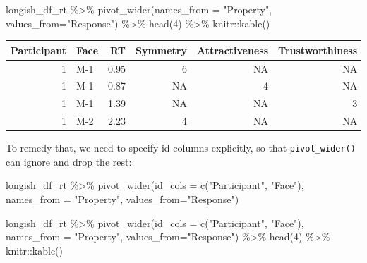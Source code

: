 \documentclass[
]{book}
\newenvironment{Shaded}{\begin{snugshade}}{\end{snugshade}}
\newcommand{\AttributeTok}[1]{\textcolor[rgb]{0.77,0.63,0.00}{#1}}
\newcommand{\DecValTok}[1]{\textcolor[rgb]{0.00,0.00,0.81}{#1}}
\newcommand{\FunctionTok}[1]{\textcolor[rgb]{0.00,0.00,0.00}{#1}}
\newcommand{\NormalTok}[1]{#1}
\newcommand{\SpecialCharTok}[1]{\textcolor[rgb]{0.00,0.00,0.00}{#1}}
\newcommand{\StringTok}[1]{\textcolor[rgb]{0.31,0.60,0.02}{#1}}
\begin{document}
\begin{Shaded}
\begin{Highlighting}[]
\NormalTok{longish\_df\_rt }\SpecialCharTok{\%\textgreater{}\%}
  \FunctionTok{pivot\_wider}\NormalTok{(}\AttributeTok{names\_from =} \StringTok{"Property"}\NormalTok{, }\AttributeTok{values\_from=}\StringTok{"Response"}\NormalTok{) }\SpecialCharTok{\%\textgreater{}\%}
  \FunctionTok{head}\NormalTok{(}\DecValTok{4}\NormalTok{) }\SpecialCharTok{\%\textgreater{}\%}
\NormalTok{  knitr}\SpecialCharTok{::}\FunctionTok{kable}\NormalTok{()}
\end{Highlighting}
\end{Shaded}

\begin{tabular}{r|l|r|r|r|r}
\hline
Participant & Face & RT & Symmetry & Attractiveness & Trustworthiness\\
\hline
1 & M-1 & 0.95 & 6 & NA & NA\\
\hline
1 & M-1 & 0.87 & NA & 4 & NA\\
\hline
1 & M-1 & 1.39 & NA & NA & 3\\
\hline
1 & M-2 & 2.23 & 4 & NA & NA\\
\hline
\end{tabular}

To remedy that, we need to specify id columns explicitly, so that \texttt{pivot\_wider()} can ignore and drop the rest:

\begin{Shaded}
\begin{Highlighting}[]
\NormalTok{longish\_df\_rt }\SpecialCharTok{\%\textgreater{}\%}
  \FunctionTok{pivot\_wider}\NormalTok{(}\AttributeTok{id\_cols =} \FunctionTok{c}\NormalTok{(}\StringTok{"Participant"}\NormalTok{, }\StringTok{"Face"}\NormalTok{), }\AttributeTok{names\_from =} \StringTok{"Property"}\NormalTok{, }\AttributeTok{values\_from=}\StringTok{"Response"}\NormalTok{)}
\end{Highlighting}
\end{Shaded}

\begin{Shaded}
\begin{Highlighting}[]
\NormalTok{longish\_df\_rt }\SpecialCharTok{\%\textgreater{}\%}
  \FunctionTok{pivot\_wider}\NormalTok{(}\AttributeTok{id\_cols =} \FunctionTok{c}\NormalTok{(}\StringTok{"Participant"}\NormalTok{, }\StringTok{"Face"}\NormalTok{), }\AttributeTok{names\_from =} \StringTok{"Property"}\NormalTok{, }\AttributeTok{values\_from=}\StringTok{"Response"}\NormalTok{) }\SpecialCharTok{\%\textgreater{}\%}
  \FunctionTok{head}\NormalTok{(}\DecValTok{4}\NormalTok{) }\SpecialCharTok{\%\textgreater{}\%}
\NormalTok{  knitr}\SpecialCharTok{::}\FunctionTok{kable}\NormalTok{()}
\end{Highlighting}
\end{Shaded}
\end{document}
